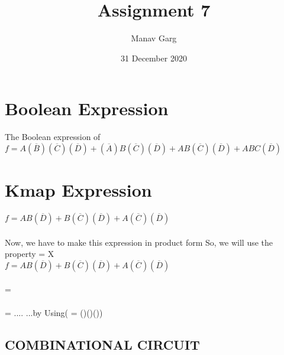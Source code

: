 \documentclass{article}
\begin{document}
\title{
Assignment 7
}
\author{Manav Garg}

\date{31 December 2020}
\maketitle


\section{Boolean Expression}
The Boolean expression of $f = A(\overline{B})(\overline{C})(\overline{D}) + (\overline{A})B(\overline{C})(\overline{D}) + AB(\overline{C})(\overline{D}) + ABC(\overline{D})$ \\ 
\section{Kmap Expression}
$f= AB(\overline{D}) + B(\overline{C})(\overline{D}) + A(\overline{C})(\overline{D})$ \\
\\
Now, we have to make this expression in product form
So, we will use the property  = X\\
$f= AB(\overline{D}) + B(\overline{C})(\overline{D}) + A(\overline{C})(\overline{D})$ \\
\\
 =  \\
\\
     = ....         ...by Using( = ()()())




\subsection{COMBINATIONAL CIRCUIT}
\end{document}

